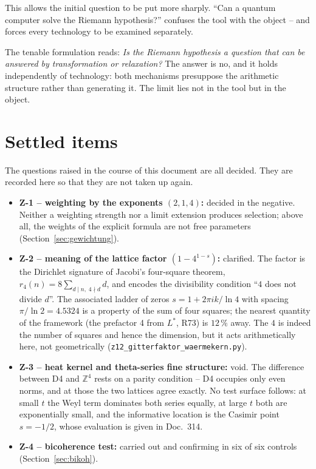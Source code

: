 This allows the initial question to be put more sharply. \enquote{Can a
quantum computer solve the Riemann hypothesis?} confuses the tool with the
object -- and forces every technology to be examined separately.

The tenable formulation reads: \emph{Is the Riemann hypothesis a question
that can be answered by transformation or relaxation?} The answer is no,
and it holds independently of technology: both mechanisms presuppose the
arithmetic structure rather than generating it. The limit lies not in the
tool but in the object.

\section{Settled items}

The questions raised in the course of this document are all decided.
They are recorded here so that they are not taken up again.

\begin{itemize}
  \item \textbf{Z-1 -- weighting by the exponents $(2,1,4)$:} decided
    in the negative. Neither a weighting strength nor a limit
    extension produces selection; above all, the weights of the
    explicit formula are not free parameters
    (Section~\ref{sec:gewichtung}).
  \item \textbf{Z-2 -- meaning of the lattice factor $(1-4^{1-s})$:}
    clarified. The factor is the Dirichlet signature of Jacobi's
    four-square theorem, $r_4(n) = 8\sum_{d\mid n,\;4\nmid d} d$, and
    encodes the divisibility condition \enquote{$4$ does not divide
    $d$}. The associated ladder of zeros $s = 1 + 2\pi i k/\ln 4$ with
    spacing $\pi/\ln 2 = 4.5324$ is a property of the sum of four
    squares; the nearest quantity of the framework (the prefactor 4
    from $L^{*}$, R73) is $12\,\%$ away. The $4$ is indeed the number
    of squares and hence the dimension, but it acts arithmetically
    here, not geometrically
    (\texttt{z12\_gitterfaktor\_waermekern.py}).
  \item \textbf{Z-3 -- heat kernel and theta-series fine structure:}
    void. The difference between D4 and $\mathbb{Z}^4$ rests on a
    parity condition -- D4 occupies only even norms, and at those the
    two lattices agree exactly. No test surface follows: at small $t$
    the Weyl term dominates both series equally, at large $t$ both are
    exponentially small, and the informative location is the Casimir
    point $s = -1/2$, whose evaluation is given in Doc.~314.
  \item \textbf{Z-4 -- bicoherence test:} carried out and confirming
    in six of six controls (Section~\ref{sec:bikoh}).
\end{itemize}

